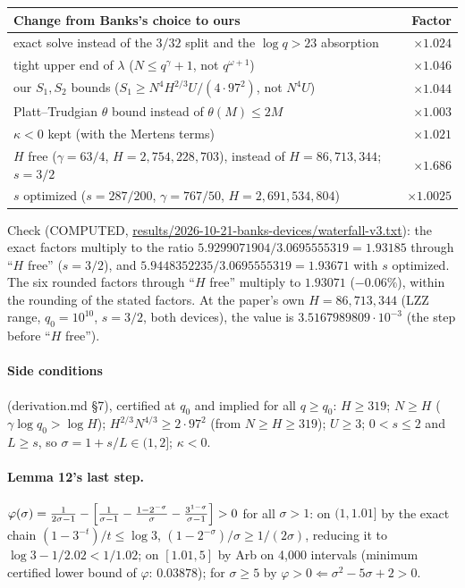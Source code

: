 \documentclass[11pt]{article}
\begin{document}
\begin{center}
\begin{tabular}{@{}lr@{}}
\toprule
Change from Banks's choice to ours & Factor\\
\midrule
exact solve instead of the $3/32$ split and the $\log q>23$ absorption & $\times1.024$\\
tight upper end of $\lambda$ ($N\le q^\gamma+1$, not $q^{\omega+1}$) & $\times1.046$\\
our $S_1,S_2$ bounds ($S_1\ge N^4H^{2/3}U/(4\cdot97^2)$, not $N^4U$) & $\times1.044$\\
Platt--Trudgian $\theta$ bound instead of $\theta(M)\le 2M$ & $\times1.003$\\
$\kappa<0$ kept (with the Mertens terms) & $\times1.021$\\
$H$ free ($\gamma=63/4$, $H=2{,}754{,}228{,}703$), instead of $H=86{,}713{,}344$; $s=3/2$ & $\times1.686$\\
$s$ optimized ($s=287/200$, $\gamma=767/50$, $H=2{,}691{,}534{,}804$) & $\times1.0025$\\
\bottomrule
\end{tabular}
\end{center}
Check (COMPUTED, \url{results/2026-10-21-banks-devices/waterfall-v3.txt}): the exact factors multiply to the ratio $5.9299071904/3.0695555319 = 1.93185$ through ``$H$ free'' ($s=3/2$), and $5.9448352235/3.0695555319 = 1.93671$ with $s$ optimized. The six rounded factors through ``$H$ free'' multiply to $1.93071$ ($-0.06\%$), within the rounding of the stated factors.
At the paper's own $H=86{,}713{,}344$ (LZZ range, $q_0=10^{10}$, $s=3/2$, both devices), the value is $3.5167989809\cdot10^{-3}$ (the step before ``$H$ free'').

\paragraph{Side conditions} (derivation.md \S7), certified at $q_0$ and implied for all $q\ge q_0$:
$H\ge 319$; $N\ge H$ ($\gamma\log q_0>\log H$); $H^{2/3}N^{4/3}\ge 2\cdot97^2$ (from $N\ge H\ge 319$); $U\ge 3$; $0<s\le2$ and $L\ge s$, so $\sigma=1+s/L\in(1,2]$; $\kappa<0$.

\paragraph{Lemma 12's last step.}
$\varphi(\sigma) = \frac{1}{2\sigma-1} - \Bigl[\frac{1}{\sigma-1} - \frac{1-2^{-\sigma}}{\sigma} - \frac{3^{1-\sigma}}{\sigma-1}\Bigr] > 0$ for all $\sigma>1$:
on $(1,1.01]$ by the exact chain $(1-3^{-t})/t\le\log 3$, $(1-2^{-\sigma})/\sigma\ge 1/(2\sigma)$, reducing it to $\log 3 - 1/2.02 < 1/1.02$;
on $[1.01,5]$ by Arb on 4{,}000 intervals (minimum certified lower bound of $\varphi$: $0.03878$);
for $\sigma\ge 5$ by $\varphi>0 \Leftarrow \sigma^2-5\sigma+2>0$.
\end{document}
